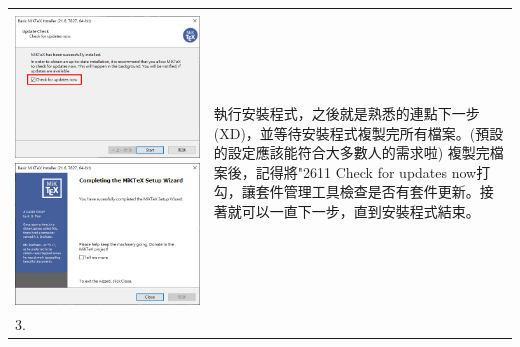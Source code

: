 \documentclass{../indiv}
\begin{document}
\begin{table}[H]
\begin{tabular}{Z}
\begin{tabmp}[-0.2]
				\includegraphics[width=0.49\linewidth]{miktex-install-3.png}\\[1.5mm]
				\includegraphics[width=0.49\linewidth]{miktex-install-4.png}
				\includegraphics[width=0.49\linewidth]{miktex-install-5.png}
			\end{tabmp} &
			執行安裝程式，之後就是熟悉的連點下一步(XD)，並等待安裝程式複製完所有檔案。(預設的設定應該能符合大多數人的需求啦)\newline
			複製完檔案後，記得將{\char"2611} Check for updates now打勾，讓套件管理工具檢查是否有套件更新。接著就可以一直下一步，直到安裝程式結束。\\
			3. &
			\begin{tabmp}[-0.3]
				\centering

\end{tabmp}
\end{tabular}
\end{table}
\end{document}
